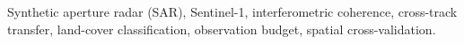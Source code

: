 \documentclass[journal]{IEEEtran}
\begin{document}
\begin{IEEEkeywords}
Synthetic aperture radar (SAR), Sentinel-1, interferometric coherence, cross-track transfer, land-cover classification, observation budget, spatial cross-validation.
\end{IEEEkeywords}






\begingroup\raggedright


\endgroup
\end{document}
